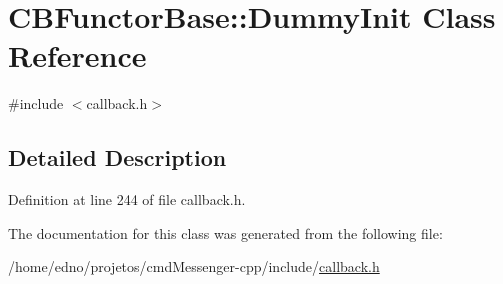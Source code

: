 \hypertarget{class_c_b_functor_base_1_1_dummy_init}{\section{C\+B\+Functor\+Base\+:\+:Dummy\+Init Class Reference}
\label{class_c_b_functor_base_1_1_dummy_init}
}


{\ttfamily \#include $<$callback.\+h$>$}



\subsection{Detailed Description}


Definition at line 244 of file callback.\+h.



The documentation for this class was generated from the following file\+:\begin{DoxyCompactItemize}
\item 
/home/edno/projetos/cmd\+Messenger-\/cpp/include/\hyperlink{callback_8h}{callback.\+h}\end{DoxyCompactItemize}
